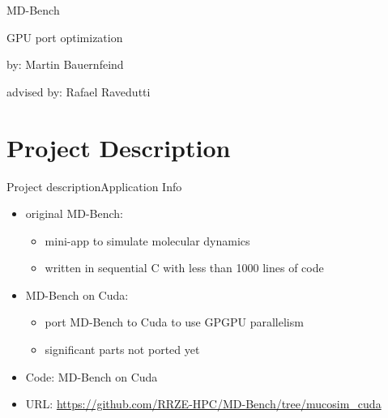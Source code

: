 \documentclass[ignorenonframetext,aspectratio=169]{beamer}
\providecommand{\tightlist}{%
  \setlength{\itemsep}{0pt}\setlength{\parskip}{0pt}}
\begin{document}
\begin{frame}
\color{blue}
\begin{center}
    \begin{Huge}
        MD-Bench
    \end{Huge}

\begin{huge}
    GPU port optimization
\end{huge}

\color{black}

by: Martin Bauernfeind

advised by: Rafael Ravedutti
\end{center}

\end{frame}

\section{Project Description}


\begin{frame}{Project description}{Application Info}
    \begin{itemize}
        \item original MD-Bench:
        \begin{itemize}
            \item mini-app to simulate molecular dynamics
            \item written in sequential C with less than 1000 lines of code
        \end{itemize}
        \vspace{\baselineskip}
        \item MD-Bench on Cuda:
        \begin{itemize}
            \item port MD-Bench to Cuda to use GPGPU parallelism
            \item significant parts not ported yet
        \end{itemize}
        \vspace{\baselineskip}
        \tightlist
        \item
        Code: MD-Bench on Cuda
        \item
        URL:
        \href{https://github.com/RRZE-HPC/MD-Bench/tree/mucosim_cuda}{https://github.com/RRZE-HPC/MD-Bench/tree/mucosim\_cuda}
    \end{itemize}
\end{frame}
\end{document}
